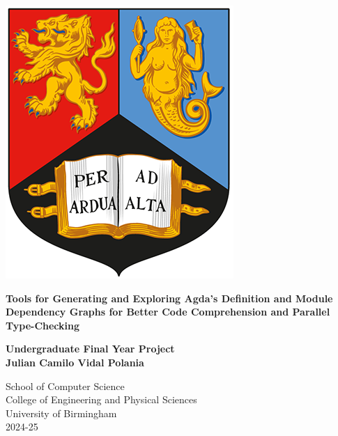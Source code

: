 
\thispagestyle{empty}

\begin{spacing}{2}
	\begin{center}
		\includegraphics[scale = 1.5]{Preamble/BirmCrest.png}
	\end{center}
	\vspace{10mm}
	\begin{center}
		\textbf{\Large Tools for Generating and Exploring Agda's Definition and
			Module Dependency Graphs for Better Code Comprehension and Parallel
		Type-Checking}
		\vspace{10mm}
	\end{center}
	\begin{center}
		\textbf{\large Undergraduate Final Year Project}
		\vspace{20mm}
		\\\textbf{\Large Julian Camilo Vidal Polania}
		\vspace{30mm}
	\end{center}
	\begin{center}
		{\large School of Computer Science}
		\\ {\large College of Engineering and Physical Sciences}
		\\ {\large University of Birmingham}
		\\ {\large 2024-25}
	\end{center}
\end{spacing}


